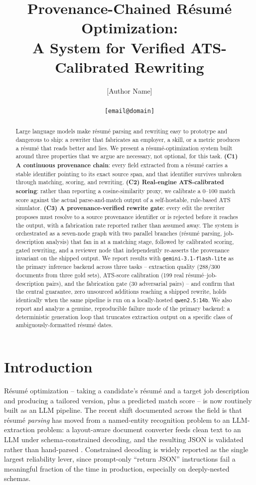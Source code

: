 \documentclass{article}
\title{Provenance-Chained Résumé Optimization:\\
A System for Verified ATS-Calibrated Rewriting}
\author{
  [Author Name] \\
  [Affiliation] \\
  \texttt{[email@domain]}
}
\begin{document}
\maketitle

\begin{abstract}
Large language models make résumé parsing and rewriting easy to prototype and dangerous to ship:
a rewriter that fabricates an employer, a skill, or a metric produces a résumé that reads better
and lies. We present a résumé-optimization system built around three properties that we argue are
necessary, not optional, for this task. \textbf{(C1) A continuous provenance chain}: every field
extracted from a résumé carries a stable identifier pointing to its exact source span, and that
identifier survives unbroken through matching, scoring, and rewriting. \textbf{(C2) Real-engine
ATS-calibrated scoring}: rather than reporting a cosine-similarity proxy, we calibrate a
$0$--$100$ match score against the actual parse-and-match output of a self-hostable, rule-based
ATS simulator. \textbf{(C3) A provenance-verified rewrite gate}: every edit the rewriter proposes
must resolve to a source provenance identifier or is rejected before it reaches the output, with a
fabrication rate reported rather than assumed away. The system is orchestrated as a
seven-node graph with two parallel branches (résumé parsing, job-description analysis) that fan in
at a matching stage, followed by calibrated scoring, gated rewriting, and a reviewer node that
independently re-asserts the provenance invariant on the shipped output. We report results with
\texttt{gemini-3.1-flash-lite} as the primary inference backend across three tasks --
extraction quality (288/300 documents from three gold sets), ATS-score calibration (199 real
résumé--job-description pairs), and the fabrication gate (30 adversarial pairs) -- and confirm
that the central guarantee, zero unsourced additions reaching a shipped rewrite, holds identically
when the same pipeline is run on a locally-hosted \texttt{qwen2.5:14b}. We also report and analyze
a genuine, reproducible failure mode of the primary backend: a deterministic generation loop that
truncates extraction output on a specific class of ambiguously-formatted résumé dates.
\end{abstract}

\section{Introduction}

Résumé optimization -- taking a candidate's résumé and a target job description and producing a
tailored version, plus a predicted match score -- is now routinely built as an LLM pipeline. The
recent shift documented across the field is that résumé \emph{parsing} has moved from a named-entity
recognition problem to an LLM-extraction problem: a layout-aware document converter feeds clean
text to an LLM under schema-constrained decoding, and the resulting JSON is validated rather than
hand-parsed \citep{docling2024,outlines2024,vllm2023}. Constrained decoding is widely reported as
the single largest reliability lever, since prompt-only ``return JSON'' instructions fail a
meaningful fraction of the time in production, especially on deeply-nested schemas.
\end{document}
